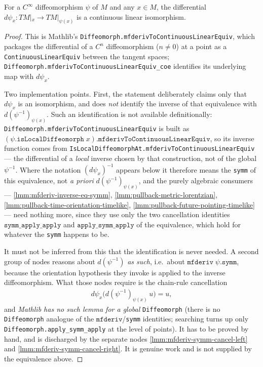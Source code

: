 \begin{lemma}
    \label{lmm:mfderiv-diffeo-linear-equiv}
    \leanok
    For a $C^\infty$ diffeomorphism $\psi$ of $M$ and any $x \in M$, the differential $d\psi_x : TM|_x \to TM|_{\psi(x)}$ is a continuous linear isomorphism.
\end{lemma}
\begin{proof}
    \leanok
    This is Mathlib's \texttt{Diffeomorph.mfderivToContinuousLinearEquiv}, which packages the differential of a $C^n$ diffeomorphism ($n \neq 0$) at a point as a \texttt{ContinuousLinearEquiv} between the tangent spaces; \texttt{Diffeomorph.mfderivToContinuousLinearEquiv\_coe} identifies its underlying map with $d\psi_x$.

    Two implementation points. First, the statement deliberately claims only that $d\psi_x$ is an isomorphism, and does \emph{not} identify the inverse of that equivalence with $d(\psi^{-1})_{\psi(x)}$. Such an identification is not available definitionally: \texttt{Diffeomorph.mfderivToContinuousLinearEquiv} is built as $(\psi.\mathtt{isLocalDiffeomorph}\;x).\mathtt{mfderivToContinuousLinearEquiv}$, so its inverse function comes from \texttt{IsLocalDiffeomorphAt.mfderivToContinuousLinearEquiv} --- the differential of a \emph{local} inverse chosen by that construction, not of the global $\psi^{-1}$. Where the notation $(d\psi_x)^{-1}$ appears below it therefore means the \texttt{symm} of this equivalence, not \emph{a priori} $d(\psi^{-1})_{\psi(x)}$, and the purely algebraic consumers --- \ref{lmm:mfderiv-inverse-eq-symm}, \ref{lmm:pullback-metric-lorentzian}, \ref{lmm:pullback-time-orientation-timelike}, \ref{lmm:pullback-future-pointing-timelike} --- need nothing more, since they use only the two cancellation identities $\mathtt{symm\_apply\_apply}$ and $\mathtt{apply\_symm\_apply}$ of the equivalence, which hold for whatever the \texttt{symm} happens to be.

    It must not be inferred from this that the identification is never needed. A second group of nodes reasons about $d(\psi^{-1})$ \emph{as such}, i.e.\ about $\mathtt{mfderiv}\;\psi.\mathtt{symm}$, because the orientation hypothesis they invoke is applied to the inverse diffeomorphism. What those nodes require is the chain-rule cancellation
    \begin{align}
        d\psi_x\big(d(\psi^{-1})_{\psi(x)}\,u\big) = u,
    \end{align}
    and \emph{Mathlib has no such lemma for a global} \texttt{Diffeomorph} (there is no \texttt{Diffeomorph} analogue of the $\mathtt{mfderiv}$/\texttt{symm} identities; searching turns up only \texttt{Diffeomorph.apply\_symm\_apply} at the level of points). It has to be proved by hand, and is discharged by the separate nodes \ref{lmm:mfderiv-symm-cancel-left} and \ref{lmm:mfderiv-symm-cancel-right}. It is genuine work and is not supplied by the equivalence above.


\end{proof}

